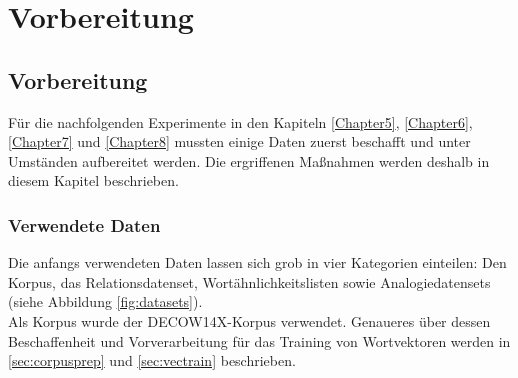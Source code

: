 
\chapter{Vorbereitung} %

\label{Chapter4} %


\section{Vorbereitung}

  Für die nachfolgenden Experimente in den Kapiteln \ref{Chapter5}, \ref{Chapter6}, \ref{Chapter7} und \ref{Chapter8}
  mussten einige Daten zuerst beschafft und unter Umständen aufbereitet werden. Die ergriffenen Maßnahmen werden
  deshalb in diesem Kapitel beschrieben.

  \subsection{Verwendete Daten}

  Die anfangs verwendeten Daten lassen sich grob in vier Kategorien einteilen: Den Korpus, das Relationsdatenset,
  Wortähnlichkeitslisten sowie Analogiedatensets (siehe Abbildung \ref{fig:datasets}).\\
  Als Korpus wurde der \textsc{DECOW14X}-Korpus verwendet. Genaueres über dessen Beschaffenheit und Vorverarbeitung für das
  Training von Wortvektoren werden in \ref{sec:corpusprep} und \ref{sec:vectrain} beschrieben.

